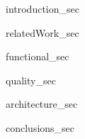 {introduction_sec}

{relatedWork_sec}

{functional_sec}

{quality_sec}

{architecture_sec}

{conclusions_sec}

